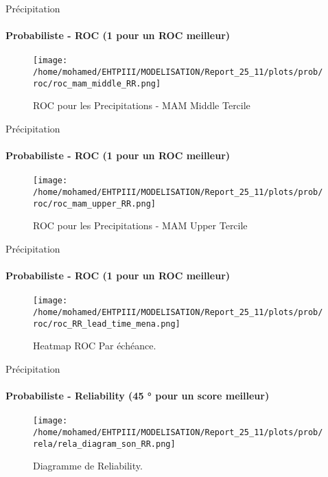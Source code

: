 \begin{frame}{Précipitation}
\framesubtitle{Probabiliste - ROC (1 pour un ROC meilleur)}

\begin{figure}
    \centering
    \texttt{[image: /home/mohamed/EHTPIII/MODELISATION/Report\_25\_11/plots/prob/roc/roc\_mam\_middle\_RR.png]}
    \caption{ROC pour les Precipitations - MAM  Middle Tercile }
    \label{fig:enter-label}
\end{figure}
\end{frame}


\begin{frame}{Précipitation}
\framesubtitle{Probabiliste - ROC (1 pour un ROC meilleur)}

\begin{figure}
    \centering
    \texttt{[image: /home/mohamed/EHTPIII/MODELISATION/Report\_25\_11/plots/prob/roc/roc\_mam\_upper\_RR.png]}
    \caption{ROC pour les Precipitations - MAM  Upper Tercile }
    \label{fig:enter-label}
\end{figure}
\end{frame}



\begin{frame}{Précipitation}
\framesubtitle{Probabiliste - ROC (1 pour un ROC meilleur)}

\begin{figure}
    \centering
    \texttt{[image: /home/mohamed/EHTPIII/MODELISATION/Report\_25\_11/plots/prob/roc/roc\_RR\_lead\_time\_mena.png]}
    \caption{Heatmap ROC  Par échéance.}
    \label{fig:enter-label}
\end{figure}
\end{frame}

\begin{frame}{Précipitation}
\framesubtitle{Probabiliste - Reliability (45 ° pour un score meilleur)}

\begin{figure}
    \centering
    \texttt{[image: /home/mohamed/EHTPIII/MODELISATION/Report\_25\_11/plots/prob/rela/rela\_diagram\_son\_RR.png]}
    \caption{Diagramme de Reliability.}
    \label{fig:enter-label}
\end{figure}
\end{frame}

